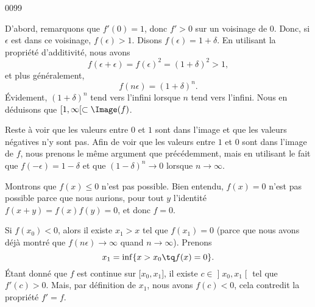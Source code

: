 
\begin{corrige}{0099}

D'abord, remarquons que $f'(0)=1$, donc $f'>0$ sur un voisinage de $0$. Donc, si $\epsilon$ est dans ce voisinage, $f(\epsilon)>1$. Disons $f(\epsilon)=1+\delta$. En utilisant la propriété d'additivité, nous avons
\begin{equation}
	f(\epsilon+\epsilon)=f(\epsilon)^2=(1+\delta)^2>1,
\end{equation}
et plus généralement,
\begin{equation}
	f(n\epsilon)=(1+\delta)^n.
\end{equation}
Évidement, $(1+\delta)^n$ tend vers l'infini lorsque $n$ tend vers l'infini. Nous en déduisons que $\mathopen[1,\infty[\subset\Image(f)$.

Reste à voir que les valeurs entre $0$ et $1$ sont dans l'image et que les valeurs négatives n'y sont pas. Afin de voir que les valeurs entre $1$ et $0$ sont dans l'image de $f$, nous prenons le même argument que précédemment, mais en utilisant le fait que $f(-\epsilon)=1-\delta$ et que $(1-\delta)^n\to 0$ lorsque $n\to\infty$.

Montrons que $f(x)\leq0$ n'est pas possible. Bien entendu, $f(x)=0$ n'est pas possible parce que nous aurions, pour tout $y$ l'identité $f(x+y)=f(x)f(y)=0$, et donc $f=0$.

Si $f(x_0)<0$, alors il existe $x_1>x$ tel que $f(x_1)=0$ (parce que nous avons déjà montré que $f(n\epsilon)\to\infty$ quand $n\to\infty$). Prenons
\begin{equation}
	x_1=\inf\{ x>x_0\tq f(x)=0 \}.
\end{equation}
Étant donné que $f$ est continue sur $\mathopen[x_0,x_1\mathclose]$, il existe $c\in\mathopen]x_0,x_1\mathclose[$ tel que $f'(c)>0$. Mais,  par définition de $x_1$, nous avons $f(c)<0$, cela contredit la propriété $f'=f$.

\end{corrige}
